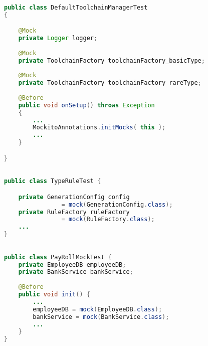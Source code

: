 \begin{lstlisting}[basicstyle=\ttfamily, caption={Example for Annotated field mocks from \texttt{DefaultToolchainManagerTest.java} in maven-core.},
basicstyle=\scriptsize\ttfamily,language = Java, framesep=4.5mm,
framexleftmargin=1mm, captionpos=b, xleftmargin=3.5ex, label=lis:annotatedMock]

public class DefaultToolchainManagerTest
{

	@Mock
	private Logger logger;
	
	@Mock
	private ToolchainFactory toolchainFactory_basicType;
	
	@Mock
	private ToolchainFactory toolchainFactory_rareType;
	
	@Before
	public void onSetup() throws Exception
	{	
		...
		MockitoAnnotations.initMocks( this );
		...
	}

}

\end{lstlisting}

\begin{lstlisting}[basicstyle=\ttfamily, caption={Example for field mocks defined in <init> from \texttt{TypeRuleTest.java} in jsonschema2pojo.},
basicstyle=\scriptsize\ttfamily,language = Java, framesep=4.5mm,
framexleftmargin=1mm, captionpos=b, xleftmargin=3.5ex, label=lis:fieldMock]

public class TypeRuleTest {

	private GenerationConfig config 
				= mock(GenerationConfig.class);
	private RuleFactory ruleFactory 
				= mock(RuleFactory.class);
	...
}

\end{lstlisting}

\begin{lstlisting}[basicstyle=\ttfamily, caption={Example for field mocks defined in Before method from \texttt{PayRollMockTest.java} in microbenchmark.},
basicstyle=\scriptsize\ttfamily,language = Java, framesep=4.5mm,
framexleftmargin=1mm, captionpos=b, xleftmargin=3.5ex, label=lis:fieldMock2]

public class PayRollMockTest {
	private EmployeeDB employeeDB;
	private BankService bankService;
	
	@Before
	public void init() {
		...
		employeeDB = mock(EmployeeDB.class);
		bankService = mock(BankService.class);
		...
	}
}

\end{lstlisting}
